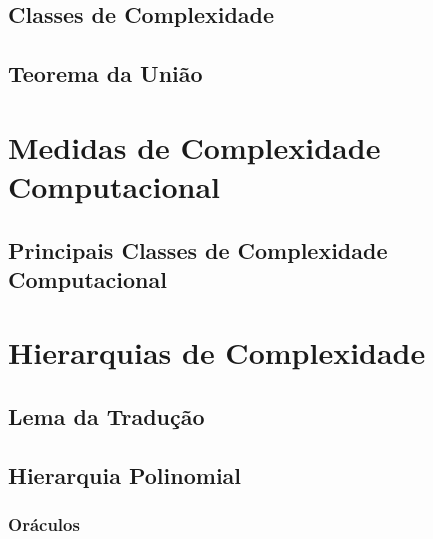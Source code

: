 \subsection{Classes de Complexidade}

\subsection{Teorema da União}

\section{Medidas de Complexidade Computacional}
\label{medidas_padrao}


\subsection{Principais Classes de Complexidade Computacional}

\section{Hierarquias de Complexidade}

\subsection{Lema da Tradução}

\subsection{Hierarquia Polinomial}

\subsubsection{Oráculos}
